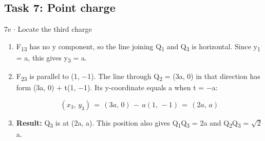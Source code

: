 \documentclass[11pt]{article}
\begin{document}
\begin{keepsection}\subsection{Task 7: Point charge}

\begin{workedbox}{7e \ensuremath{\cdot} Locate the third charge}
\begin{enumerate}
\item F\textsubscript{13} has no y component, so the line joining Q\textsubscript{1} and Q\textsubscript{3} is horizontal. Since y\textsubscript{1} = a, this gives y\textsubscript{3} = a.
\item {}
F\textsubscript{23} is parallel to (1, \ensuremath{-}1). The line through Q\textsubscript{2} = (3a, 0) in that direction has form (3a, 0) + t(1, \ensuremath{-}1). Its y-coordinate equals a when t = \ensuremath{-}a:

\begin{equation*}({x}_{3},\, {y}_{3})\, =\, (3{a},\, 0)\, -\, {a}(1,\, -1)\, =\, (2{a},\, {a})\end{equation*}
\item {}
\textbf{Result:} Q\textsubscript{3} is at (2a, a). This position also gives Q\textsubscript{1}Q\textsubscript{3} = 2a and Q\textsubscript{2}Q\textsubscript{3} = \ensuremath{\sqrt{2}} a.


\end{enumerate}
\end{workedbox}
\end{keepsection}
\end{document}

